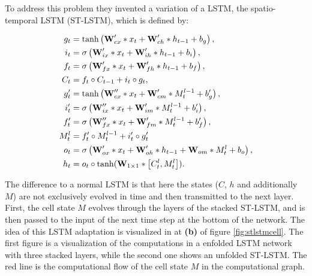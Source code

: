 To address this problem they invented a variation of a LSTM, the spatio-temporal LSTM (ST-LSTM), which is defined by:

\begin{align}\label{eq:stlstm}
    g_t&=\tanh\left(\textbf{W}'_{cx}*x_t + \textbf{W}'_{ch}* h_{t-1} + b_g\right),\notag\\
    i_t&=\sigma\left(\textbf{W}'_{ix}* x_t + \textbf{W}'_{ih}* h_{t-1} + b_i\right),\notag\\
    f_t&=\sigma\left(\textbf{W}'_{fx}* x_t + \textbf{W}'_{fh}* h_{t-1} + b_f\right),\notag \\
    C_t&=f_t\circ C_{t-1}+i_t\circ g_t,\notag\\
    g'_t&=\tanh\left(\textbf{W}''_{cx}*x_t + \textbf{W}'_{cm}* M^{l-1}_{t} + b'_g\right),\notag\\
    i'_t&=\sigma\left(\textbf{W}''_{ix}* x_t + \textbf{W}'_{im}* M^{l-1}_{t} + b'_i\right),\notag\\
    f'_t&=\sigma\left(\textbf{W}''_{fx}* x_t + \textbf{W}'_{fm}* M^{l-1}_{t} + b'_f\right),\notag\\
    M^{l}_t&=f'_t\circ M^{l-1}_t+i'_t\circ g'_t\notag\\
    o_t&=\sigma\left(\textbf{W}'_{ox}*x_t + \textbf{W}'_{oh}*h_{t-1} + \textbf{W}_{om}*M_t^l + b_o\right),\notag\\
    h_t&=o_t\circ\tanh(\textbf{W}_{1\times 1}*\left[C_t^l,M_t^l\right]).\notag\\
\end{align}

The difference to a normal LSTM is that here the states ($C$, $h$ and additionally $M$) are not exclusively evolved in time and then transmitted to the next layer. First, the cell state $M$ evolves through the layers of the stacked ST-LSTM, and is then passed to the input of the next time step at the bottom of the network. The idea of this LSTM adaptation is visualized in at \textbf{(b)} of figure \ref{fig:stlstmcell}. The first figure is a visualization of the computations in a enfolded LSTM network with three stacked layers, while the second one shows an unfolded ST-LSTM. The red line is the computational flow of the cell state $M$ in the computational graph.


